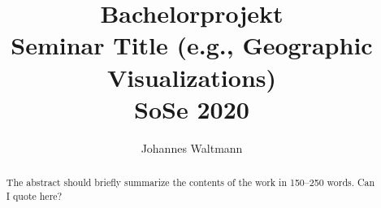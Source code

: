 \documentclass[runningheads]{llncs}
\begin{document}
%
\title{Bachelorprojekt \\ Seminar Title (e.g., Geographic Visualizations) \\ SoSe 2020}
%
%
\author{Johannes Waltmann}
%
%
%
\maketitle              %
%
\begin{abstract}
The abstract should briefly summarize the contents of the work in
150--250 words.
Can I quote here?

\end{abstract}



%
%
%
 
 
%
\end{document}
